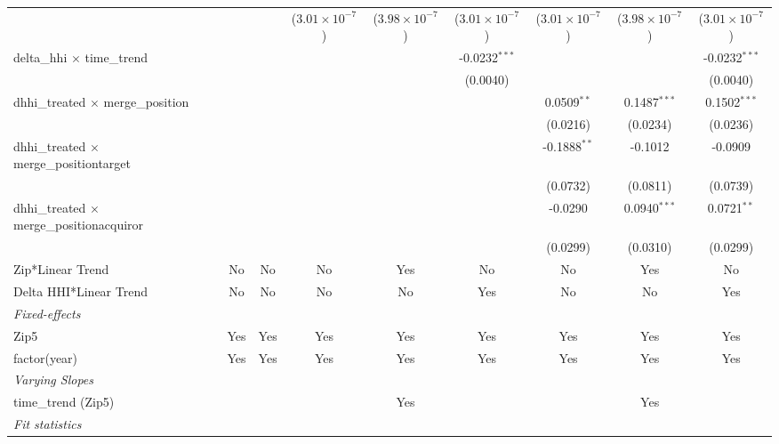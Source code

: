 \begin{table}[H]
{\begin{tabular}{lcccccccc}
   &   &    & ($3.01\times 10^{-7}$) & ($3.98\times 10^{-7}$) & ($3.01\times 10^{-7}$) & ($3.01\times 10^{-7}$) & ($3.98\times 10^{-7}$) & ($3.01\times 10^{-7}$)\\ 

 delta\_hhi $\times $ time\_trend&   &    &    &    & -0.0232$^{***}$ &    &    & -0.0232$^{***}$\\ 

   &   &    &    &    & (0.0040) &    &    & (0.0040)\\ 

 dhhi\_treated $\times $ merge\_position&   &    &    &    &    & 0.0509$^{**}$ & 0.1487$^{***}$ & 0.1502$^{***}$\\ 

   &   &    &    &    &    & (0.0216) & (0.0234) & (0.0236)\\ 

 dhhi\_treated $\times $ merge\_positiontarget&   &    &    &    &    & -0.1888$^{**}$ & -0.1012 & -0.0909\\ 

   &   &    &    &    &    & (0.0732) & (0.0811) & (0.0739)\\ 

 dhhi\_treated $\times $ merge\_positionacquiror&   &    &    &    &    & -0.0290 & 0.0940$^{***}$ & 0.0721$^{**}$\\ 

   &   &    &    &    &    & (0.0299) & (0.0310) & (0.0299)\\ 

 Zip*Linear Trend & No & No & No & Yes & No & No & Yes & No\\ 

 Delta HHI*Linear Trend & No & No & No & No & Yes & No & No & Yes\\ 

 \midrule \emph{Fixed-effects}&   &   &   &   &   &   &   &  \\ 

 Zip5 & Yes & Yes & Yes & Yes & Yes & Yes & Yes & Yes\\ 

 factor(year) & Yes & Yes & Yes & Yes & Yes & Yes & Yes & Yes\\ 

 \midrule \emph{Varying Slopes}&   &   &   &   &   &   &   &  \\ 

 time\_trend (Zip5) &  &  &  & Yes &  &  & Yes & \\ 

 \midrule \emph{Fit statistics}&  & & & & & & & \\ 


\end{tabular}}
\end{table}
